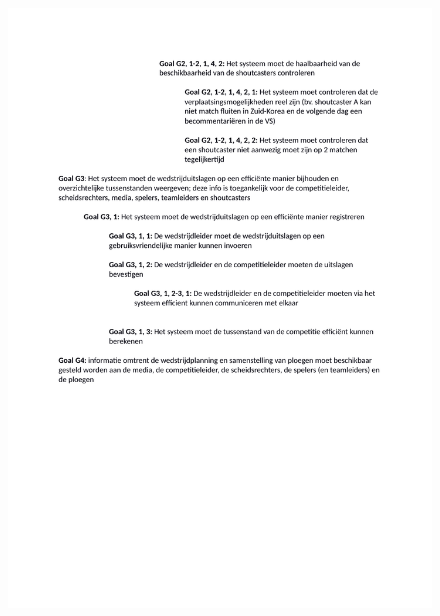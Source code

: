 \documentclass[12pt,a4paper]{article}
\begin{document}
			\begin{figure}[H]
				\includegraphics[width=\textwidth]{../2-Doelen/Goals4.pdf}
			\end{figure}
\end{document}
